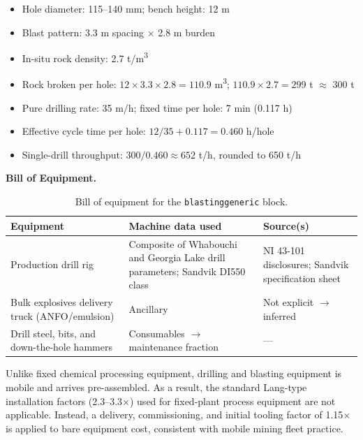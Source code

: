 \documentclass{article}
\renewcommand\_{\textunderscore\allowbreak}
\begin{document}
\begin{itemize}[noitemsep]
	\item Hole diameter: 115--140 mm; bench height: 12 m
	\item Blast pattern: 3.3 m spacing $\times$ 2.8 m burden
	\item In-situ rock density: 2.7 \si{t/m^3}
	\item Rock broken per hole: $12 \times 3.3 \times 2.8 = 110.9$ \si{m^3}; $110.9 \times 2.7 = 299$ t $\approx$ 300 t
	\item Pure drilling rate: 35 m/h; fixed time per hole: 7 min (0.117 h)
	\item Effective cycle time per hole: $12/35 + 0.117 = 0.460$ h/hole
	\item Single-drill throughput: $300 / 0.460 \approx 652$ t/h, rounded to 650 t/h
\end{itemize}

\medskip
\noindent\textbf{Bill of Equipment.}\quad

\begin{table}[h!]
\caption{Bill of equipment for the \texttt{blasting\_generic} block.}
\centering
\begin{tabular}{>{\raggedright\arraybackslash}p{5.2cm}
                >{\raggedright\arraybackslash}p{4cm}
                >{\raggedright\arraybackslash}p{4.5cm}}
\toprule
\textbf{Equipment} & \textbf{Machine data used} & \textbf{Source(s)} \\
\midrule
Production drill rig & Composite of Whabouchi and Georgia Lake drill parameters; Sandvik DI550 class & NI 43-101 disclosures; Sandvik specification sheet \\
Bulk explosives delivery truck (ANFO/emulsion) & Ancillary & Not explicit $\rightarrow$ inferred \\
Drill steel, bits, and down-the-hole hammers & Consumables $\rightarrow$ maintenance fraction & --- \\
\bottomrule
\end{tabular}
\end{table}

\noindent Unlike fixed chemical processing equipment, drilling and blasting equipment is mobile and arrives pre-assembled. As a result, the standard Lang-type installation factors (2.3--3.3$\times$) used for fixed-plant process equipment are not applicable. Instead, a delivery, commissioning, and initial tooling factor of 1.15$\times$ is applied to bare equipment cost, consistent with mobile mining fleet practice.
\end{document}
